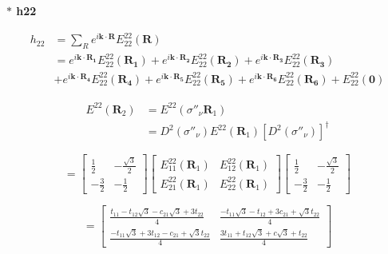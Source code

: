 \documentclass{report}
\begin{document}
\textbf{ $\ast$ h22}

\begin{align}
    h_{22} & = \sum_{R}^{} e^{i\mathbf{k\cdot R}} E^{22}_{22}(\textbf{R}) \nonumber                                                                                                                                \\
           & =  e^{i\mathbf{k\cdot R_1}} E^{22}_{22}(\mathbf{R_1}) +  e^{i\mathbf{k\cdot R_2}} E^{22}_{22}(\mathbf{R_2}) +  e^{i\mathbf{k\cdot R_3}} E^{22}_{22}(\mathbf{R_3}) \nonumber                           \\
           & +  e^{i\mathbf{k\cdot R_4}} E^{22}_{22}(\mathbf{R_4}) +  e^{i\mathbf{k\cdot R_5}} E^{22}_{22}(\mathbf{R_5}) +  e^{i\mathbf{k\cdot R_6}} E^{22}_{22}(\mathbf{R_6}) + E^{22}_{22}(\mathbf{0}) \nonumber
\end{align}

\begin{align}
    E^{22} (\mathbf{R}_2)
     & =  E^{22} (\sigma''_\nu \mathbf{R}_1) \nonumber                                              \\
     & = D^2(\sigma''_\nu)  E^{22}(\mathbf{R}_1) \left[ D^2(\sigma''_\nu) \right]^\dagger \nonumber
\end{align}

\[
    \renewcommand{\arraystretch}{0.75}
    =
    \begin{bmatrix}
        \frac{1}{2}  & -\frac{\sqrt{3}}{2} \\
        -\frac{3}{2} & -\frac{1}{2}
    \end{bmatrix}
    \begin{bmatrix}
        E_{11}^{22}(\mathbf{R}_1) & E_{12}^{22}(\mathbf{R}_1) \\
        E_{21}^{22}(\mathbf{R}_1) & E_{22}^{22}(\mathbf{R}_1)
    \end{bmatrix}
    \begin{bmatrix}
        \frac{1}{2}  & -\frac{\sqrt{3}}{2} \\
        -\frac{3}{2} & -\frac{1}{2}
    \end{bmatrix}
\]

\[
    \renewcommand{\arraystretch}{0.75}
    =
    \begin{bmatrix}
        \frac{t_{11} - t_{12}\sqrt{3} -c_{21}\sqrt{3} + 3t_{22}}{4}   & \frac{-t_{11}\sqrt{3} - t_{12} + 3c_{21} + \sqrt{3}t_{22}}{4} \\
        \frac{-t_{11}\sqrt{3} + 3t_{12} - c_{21} + \sqrt{3}t_{22}}{4} & \frac{3t_{11} + t_{12}\sqrt{3} + c\sqrt{3} + t_{22}}{4}
    \end{bmatrix}
\]
\end{document}
